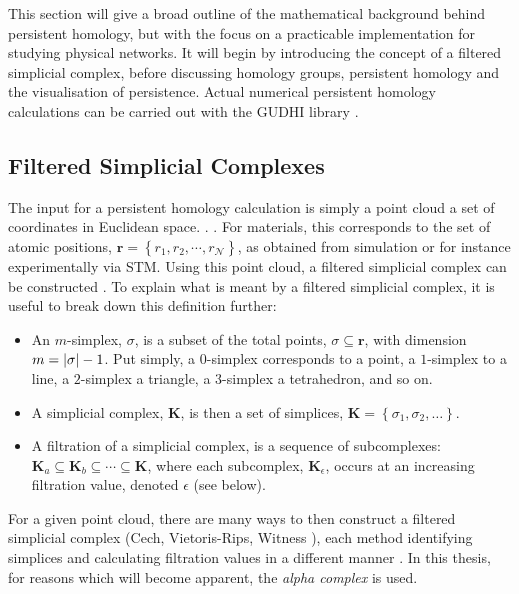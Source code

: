 This section will give a broad outline of the mathematical background behind persistent homology, but with the focus on a practicable implementation for studying physical \td{} networks.
It will begin by introducing the concept of a filtered simplicial complex, before discussing homology groups, persistent homology and the visualisation of persistence.
Actual numerical persistent homology calculations can be carried out with the GUDHI library \cite{gudhi}.

\subsection{Filtered Simplicial Complexes}

The input for a persistent homology calculation is simply a point cloud \ie{} a set of coordinates in Euclidean space.
.
.
For materials, this corresponds to the set of atomic positions, $\mathbf{r}=\left\{r_1,r_2,\cdots,r_\mathcal{N}\right\}$, as obtained from simulation or for instance experimentally via STM.
Using this point cloud, a filtered simplicial complex can be constructed \cite{Fugacci2016}.
To explain what is meant by a filtered simplicial complex, it is useful to break down this definition further:
\begin{itemize}
	\item An $m$\--simplex, $\sigma$, is a subset of the total points, $\sigma\subseteq\mathbf{r}$, with dimension $m=\lvert\sigma\rvert-1$.
Put simply, a $0$\--simplex corresponds to a point, a $1$\--simplex to a line, a $2$\--simplex a triangle, a $3$\--simplex a tetrahedron, and so on.%
	\item A simplicial complex, $\mathbf{K}$, is then a set of simplices, $\mathbf{K}=\left\{\sigma_1,\sigma_2,\dots\right\}$.
	\item A filtration of a simplicial complex, is a sequence of subcomplexes: $\mathbf{K}_a \subseteq \mathbf{K}_b \subseteq \cdots \subseteq \mathbf{K}$, where each subcomplex, $\mathbf{K}_\epsilon$, occurs at an increasing filtration value, denoted $\epsilon$ (see below).
\end{itemize}
For a given point cloud, there are many ways to then construct a filtered simplicial complex (Cech, Vietoris\--Rips, Witness \etc), each method identifying simplices and calculating filtration values in a different manner  \cite{Otter2017}.
In this thesis, for reasons which will become apparent, the \textit{alpha complex} is used.

